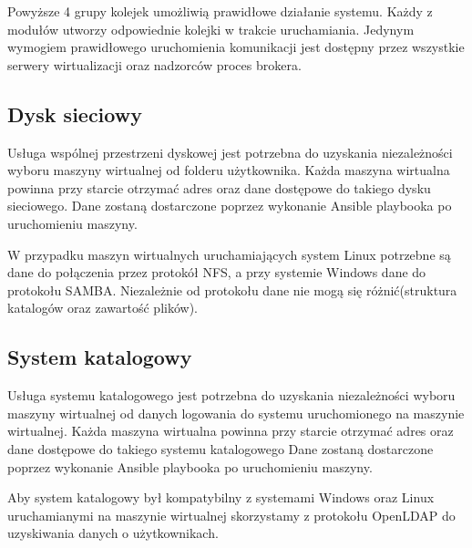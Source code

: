 \documentclass[../deliverable-two.tex]{subfiles}
\begin{document}
Powyższe 4 grupy kolejek umożliwią prawidłowe działanie systemu.
Każdy z modułów utworzy odpowiednie kolejki w trakcie uruchamiania.
Jedynym wymogiem prawidłowego uruchomienia komunikacji jest dostępny przez wszystkie serwery wirtualizacji oraz nadzorców proces brokera.

\subsection{Dysk sieciowy}
Usługa wspólnej przestrzeni dyskowej jest potrzebna do uzyskania niezależności wyboru maszyny wirtualnej od folderu użytkownika.
Każda maszyna wirtualna powinna przy starcie otrzymać adres oraz dane dostępowe do takiego dysku sieciowego.
Dane zostaną dostarczone poprzez wykonanie Ansible playbooka po uruchomieniu maszyny.

W przypadku maszyn wirtualnych uruchamiających system Linux potrzebne są dane do połączenia przez protokół NFS, a przy systemie Windows dane do protokołu SAMBA.
Niezależnie od protokołu dane nie mogą się różnić(struktura katalogów oraz zawartość plików).

\subsection{System katalogowy}
Usługa systemu katalogowego jest potrzebna do uzyskania niezależności wyboru maszyny wirtualnej od danych logowania do systemu uruchomionego na maszynie wirtualnej.
Każda maszyna wirtualna powinna przy starcie otrzymać adres oraz dane dostępowe do takiego systemu katalogowego
Dane zostaną dostarczone poprzez wykonanie Ansible playbooka po uruchomieniu maszyny.

Aby system katalogowy był kompatybilny z systemami Windows oraz Linux uruchamianymi na maszynie wirtualnej skorzystamy z protokołu OpenLDAP do uzyskiwania danych o użytkownikach.
\end{document}
